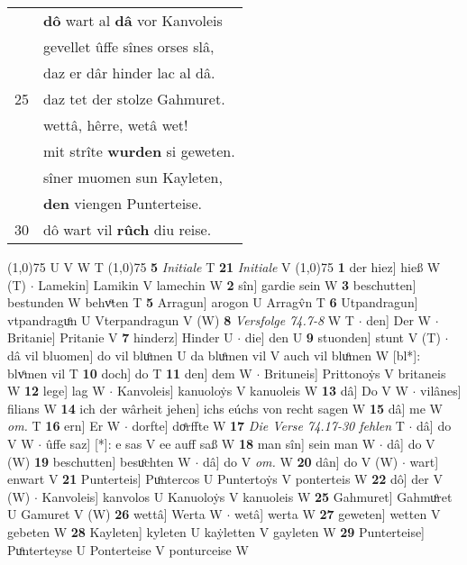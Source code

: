 \documentclass[8pt,a4paper,notitlepage]{article}
\begin{document}
\begin{table}[ht]
\begin{minipage}[t]{0.5\linewidth}
\begin{tabular}{rl}
 & \textbf{dô} wart al \textbf{dâ} vor Kanvoleis\\ 
 & gevellet ûffe sînes orses slâ,\\ 
 & daz er dâr hinder lac al dâ.\\ 
25 & daz tet der stolze Gahmuret.\\ 
 & wettâ, hêrre, wetâ wet!\\ 
 & mit strîte \textbf{wurden} si geweten.\\ 
 & sîner muomen sun Kayleten,\\ 
 & \textbf{den} viengen Punterteise.\\ 
30 & dô wart vil \textbf{rûch} diu reise.\\ 
\end{tabular}
\scriptsize
\line(1,0){75} \newline
U V W T \newline
\line(1,0){75} \newline
\textbf{5} \textit{Initiale} T  \textbf{21} \textit{Initiale} V  \newline
\line(1,0){75} \newline
\textbf{1} der hiez] hieß W (T)  $\cdot$ Lamekin] Lamikin V lamechin W \textbf{2} sîn] gardie sein W \textbf{3} beschutten] bestunden W behvͦten T \textbf{5} Arragun] arogon U Arragv̂n T \textbf{6} Utpandragun] vtpandraguͦn U Vterpandragun V (W) \textbf{8} \textit{Versfolge 74.7-8} W T   $\cdot$ den] Der W  $\cdot$ Britanie] Pritanie V \textbf{7} hinderz] Hinder U  $\cdot$ die] den U \textbf{9} stuonden] stunt V (T)  $\cdot$ dâ vil bluomen] do vil bluͦmen U da bluͦmen vil V auch vil bluͦmen W [bl*]: blvͦmen vil T \textbf{10} doch] do T \textbf{11} den] dem W  $\cdot$ Brituneis] Prittonoẏs V britaneis W \textbf{12} lege] lag W  $\cdot$ Kanvoleis] kanuoloẏs V kanuoleis W \textbf{13} dâ] Do V W  $\cdot$ vilânes] filians W \textbf{14} ich der wârheit jehen] ichs eúchs von recht sagen W \textbf{15} dâ] me W \textit{om.} T \textbf{16} ern] Er W  $\cdot$ dorfte] doͤrffte W \textbf{17} \textit{Die Verse 74.17-30 fehlen} T   $\cdot$ dâ] do V W  $\cdot$ ûffe saz] [*]: e sas V ee auff saß W \textbf{18} man sîn] sein man W  $\cdot$ dâ] do V (W) \textbf{19} beschutten] besuͦchten W  $\cdot$ dâ] do V \textit{om.} W \textbf{20} dân] do V (W)  $\cdot$ wart] enwart V \textbf{21} Punterteis] Puͦntercos U Puntertoẏs V ponterteis W \textbf{22} dô] der V (W)  $\cdot$ Kanvoleis] kanvolos U Kanuoloẏs V kanuoleis W \textbf{25} Gahmuret] Gahmuͦret U Gamuret V (W) \textbf{26} wettâ] Werta W  $\cdot$ wetâ] werta W \textbf{27} geweten] wetten V gebeten W \textbf{28} Kayleten] kyleten U kaẏletten V gayleten W \textbf{29} Punterteise] Puͦnterteyse U Ponterteise V ponturceise W \newline
\end{minipage}
\end{table}
\end{document}
